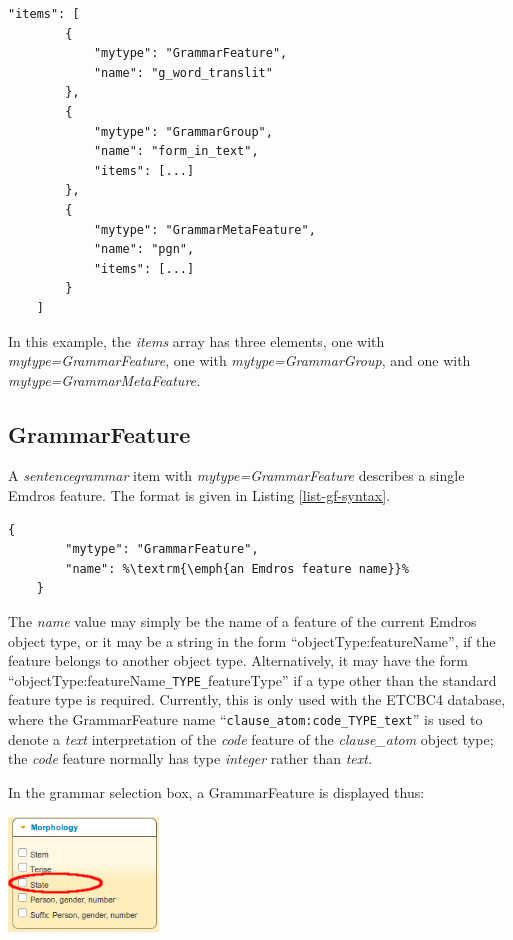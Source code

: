\documentclass[11pt,oneside,a4paper]{memoir}
\begin{document}
\begin{lstlisting}[caption=A sample items value,label=list-itemssample]
    "items": [
        {
            "mytype": "GrammarFeature",
            "name": "g_word_translit"
        },
        {
            "mytype": "GrammarGroup",
            "name": "form_in_text",
            "items": [...]
        },
        {
            "mytype": "GrammarMetaFeature",
            "name": "pgn",
            "items": [...]
        }
    ]
\end{lstlisting}

In this example, the \emph{items} array has three elements, one with \emph{mytype=GrammarFeature},
one with \emph{mytype=GrammarGroup}, and one with \emph{mytype=GrammarMetaFeature.}

\subsection{GrammarFeature}\label{sec-grammarfeature}

A \emph{sentencegrammar} item with \emph{mytype=GrammarFeature} describes a single Emdros
feature. The format is given in Listing \ref{list-gf-syntax}.

\begin{lstlisting}[caption=GrammarFeature syntax,label=list-gf-syntax]
    {
        "mytype": "GrammarFeature",
        "name": %\textrm{\emph{an Emdros feature name}}%
    }
\end{lstlisting}

The \emph{name} value may simply be the name of a feature of the current Emdros object type, or it
may be a string in the form ``objectType:featureName'', if the feature belongs to another object
type. Alternatively, it may have the form ``objectType:featureName\texttt{\_TYPE\_}featureType'' if
a type other than the standard feature type is required. Currently, this is only used with the
ETCBC4 database, where the GrammarFeature name ``\texttt{clause\_atom:code\_TYPE\_text}'' is used to
denote a \emph{text} interpretation of the \emph{code} feature of the \emph{clause\_atom} object
type; the \emph{code} feature normally has type \emph{integer} rather than \emph{text.}

\Needspace*{5cm}%
In the grammar selection box, a GrammarFeature is displayed thus:

\begin{center}
  \includegraphics[width=0.3\textwidth]{state1.png}
\end{center}
\end{document}
